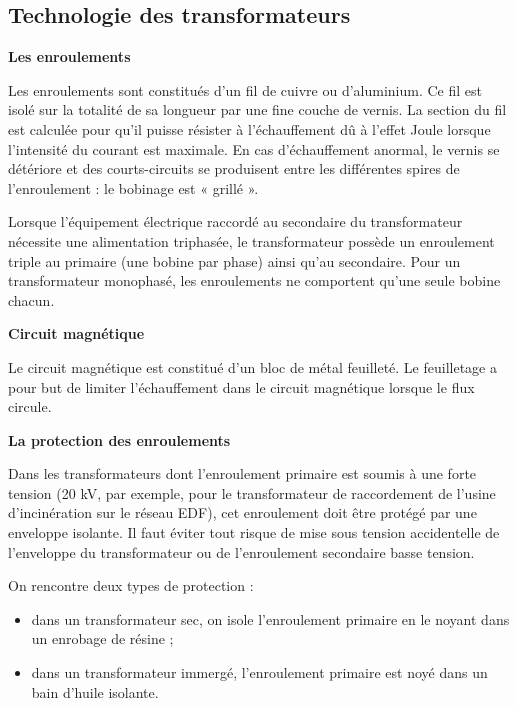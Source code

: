  \subsection{Technologie des transformateurs}

\vspace{0.3cm}
\textbf{Les enroulements}
\vspace{0.3cm}

Les enroulements sont constitués d’un fil de cuivre ou d’aluminium. Ce fil est isolé sur la totalité de sa longueur par une fine couche de vernis.
La section du fil est calculée pour qu’il puisse résister à l’échauffement dû à l’effet Joule lorsque l’intensité du courant est maximale. En cas d’échauffement anormal, le vernis se détériore et des courts-circuits se produisent entre les différentes spires de l’enroulement : le bobinage est « grillé ».
\vspace{0.3cm}

Lorsque l’équipement électrique raccordé au secondaire du transformateur nécessite une alimentation triphasée, le transformateur possède un enroulement triple au primaire (une bobine par phase) ainsi qu’au secondaire. Pour un transformateur monophasé, les enroulements ne comportent qu’une seule bobine chacun.


\vspace{0.3cm}
\textbf{Circuit magnétique}
\vspace{0.3cm}

Le circuit magnétique est constitué d’un bloc de métal feuilleté. Le feuilletage a pour but de limiter l’échauffement dans le circuit magnétique lorsque le flux circule.

\vspace{0.3cm}
\textbf{La protection des enroulements}
\vspace{0.3cm}

Dans les transformateurs dont l’enroulement primaire est soumis à une forte tension (20 kV, par exemple, pour le transformateur de raccordement de l’usine d’incinération sur le réseau EDF), cet enroulement doit être protégé par une enveloppe isolante. Il faut éviter tout risque de mise sous tension accidentelle de l’enveloppe du transformateur ou de l’enroulement secondaire basse tension.
\vspace{0.3cm}

On rencontre deux types de protection :

\begin{itemize}
\item dans un transformateur sec, on isole l’enroulement primaire en le noyant dans un enrobage de résine ;
\item dans un transformateur immergé, l’enroulement primaire est noyé dans un bain d’huile isolante.
\end{itemize}

